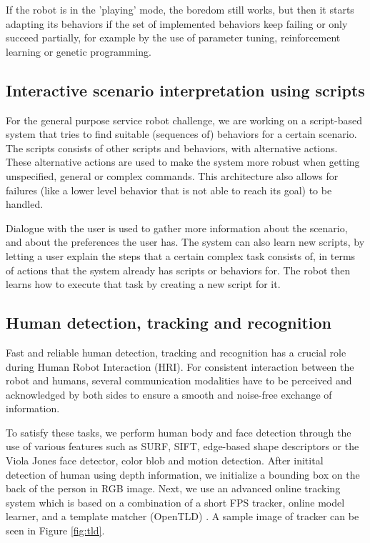 \documentclass[runningheads,a4paper]{llncs}
\begin{document}
If the robot is in the 'playing' mode, the boredom still works, but then it starts adapting its behaviors if the set of implemented behaviors keep failing or only succeed partially, for example by the use of parameter tuning, reinforcement learning or genetic programming.

\subsection{Interactive scenario interpretation using scripts}

For the general purpose service robot challenge, we are working on a script-based system that tries to find suitable (sequences of) behaviors for a certain scenario. 
The scripts consists of other scripts and behaviors, with alternative actions.
These alternative actions are used to make the system more robust when getting unspecified, general or complex commands.
This architecture also allows for failures (like a lower level behavior that is not able to reach its goal) to be handled.

Dialogue with the user is used to gather more information about the scenario, and about the preferences the user has. 
The system can also learn new scripts, by letting a user explain the steps that a certain complex task consists of, in terms of actions that the system already has scripts or behaviors for. 
The robot then learns how to execute that task by creating a new script for it.

\subsection{Human detection, tracking and recognition}

Fast and reliable human detection, tracking and recognition has a crucial role during Human Robot Interaction (HRI).
For consistent interaction between the robot and humans, several communication modalities have to be perceived and acknowledged by both sides to ensure a smooth and noise-free exchange of information.

To satisfy these tasks, we perform human body and face detection through the use of various features such as SURF\cite{bay2008speeded}, SIFT\cite{yan1995sift}, edge-based shape descriptors or the Viola Jones face detector\cite{viola2001rapid}, color blob and motion detection. 
After initital detection of human using depth information, we initialize a bounding box on the back of the person in RGB image. 
Next, we use an advanced online tracking system which is based on a combination of a short FPS tracker, online model learner, and a template matcher (OpenTLD) \cite{kalal2010face}\cite{kalal2010forward}. 
A sample image of tracker can be seen in Figure \ref{fig:tld}.
\end{document}
